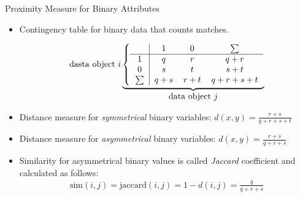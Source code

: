 \begin{frame}{Proximity Measure for Binary Attributes}
  \begin{itemize}
  \item Contingency table for binary data that counts matches.
    \begin{center}
      \vspace{-2em}
      \[
        \text{dasta object}~i\underbrace{
          \left\{\begin{tabular}{ c | c c c }
                   & $1$ & $0$ & $\sum$ \\ \hline
                   $1$ & $q$ & $r$ & $q+r$\\
                   $0$ & $s$ & $t$ & $s+t$\\
                   $\sum$ & $q+s$ & $r+t$ & $q+r+s+t$
                 \end{tabular}\right.}_{\let\scriptstyle\textstyle\substack{\text{data object}~j}}
           \]
    \end{center}
  \item Distance measure for \textit{symmetrical} binary variables: $d(x,y) = \frac{r+s}{q+r+s+t}$
  \item Distance measure for \textit{asymmetrical} binary variables: $d(x,y) = \frac{r+s}{q+r+s}$
  \item Similarity for asymmetrical binary values is called \textit{Jaccard} coefficient and calculated as follows:
    \begin{align*}
      \text{sim}(i,j)=\text{jaccard}(i,j)=1-d(i,j)=\frac{q}{q+r+s}
    \end{align*}
  \end{itemize}
\end{frame}

